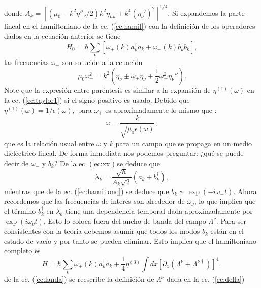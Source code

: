donde $A_k=[(\mu_0-k^2\eta''_{\nu}/2)k^2\eta_{nu}+k^4(\eta_{\nu}')^2]^{1/4}$. Si expandemos la parte lineal en el hamiltoniano de la ec. (\ref{ec:hamil}) con la definici\'{o}n de los operadores dados en la ecuaci\'{o}n anterior se tiene
\begin{equation}\label{ec:hamiltonq}
H_0=\hbar\sum_k[\omega_+(k)a_k^{\dagger}a_k+\omega_-(k)b_k^{\dagger}b_k],
\end{equation}
las frecuencias $\omega_{\pm}$ son soluci\'{o}n a la ecuaci\'{o}n
\begin{equation}\label{ec:frec}
\mu_0\omega_{\pm}^2=k^2(\eta_{\nu} \pm\omega_{\pm}\eta_{\nu}+\frac{1}{2}\omega_{\pm}^2\eta_{\nu}'').
\end{equation}
Note que la expresi\'{o}n entre par\'{e}ntesis es similar a la expansi\'{o}n de $\eta^{(1)}(\omega)$ en la ec. (\ref{ec:taylor1}) si el signo positivo es usado. Debido que $\eta^{(1)}(\omega)=1/\epsilon(\omega),$ para $\omega_+$ es aproximadamente lo mismo que \citep{squeezing2004pd}:
\begin{equation}
\omega=\frac{k}{\sqrt{\mu_0\epsilon(\omega)}},
\end{equation}
que es la relación usual entre $\omega$ y $k$ para un campo que se propaga en un medio dieléctrico lineal. De forma inmediata nos podemos preguntar: ¿qu\'{e} se puede decir de $\omega_-$ y $b_k$? De la ec. (\ref{ec:xx}) se deduce que
\begin{equation}\label{ec:landa}
\lambda_k=\frac{\sqrt{\hbar}}{A_k\sqrt{2}}(a_k+b_k^{\dagger}),
\end{equation}
mientras que de la ec. (\ref{ec:hamiltonq}) se deduce que $b_k\sim\exp(-i\omega_-t)$. Ahora recordemos que las frecuencias de inter\'es son alrededor de $\omega_{\nu}$, lo que implica que el t\'{e}rmino $b_k^{\dagger}$ en $\lambda_k$ tiene una dependencia temporal dada aproximadamente por $\exp(i\omega_{\nu}t)$. Esto lo coloca fuera del ancho de banda del campo $\Lambda ^{\nu}$. Para ser consistentes con la teor\'{i}a debemos asumir que todos los modos $b_k$ están en el estado de vacío y por tanto se pueden eliminar. Esto implica que el hamiltoniano completo es
\begin{equation}
H=\hbar \sum_k \omega_+(k)a_k^{\dagger}a_k+\frac{1}{4}\eta^{(3)}\int dx [\partial_x(\Lambda^{\nu}+\Lambda^{\nu \dagger})]^4,
\end{equation}
de la ec. (\ref{ec:landa}) se reescribe la definici\'{o}n de $\Lambda^{\nu}$ dada en la ec. (\ref{ec:defla})

